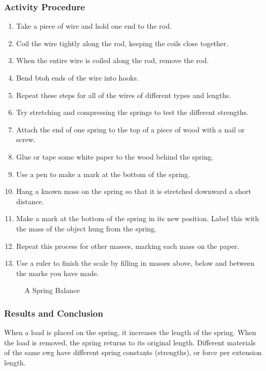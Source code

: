 \subsubsection*{Activity Procedure}
\begin{enumerate}
\item{Take a piece of wire and hold one end to the rod.}
\item{Coil the wire tightly along the rod, keeping the coils close together.}
\item{When the entire wire is coiled along the rod, remove the rod.}
\item{Bend btoh ends of the wire into hooks.}
\item{Repeat these steps for all of the wires of different types and lengths.}
\item{Try stretching and compressing the springs to test the different strengths.}
\item{Attach the end of one spring to the top of a piece of wood with a nail or screw.}
\item{Glue or tape some white paper to the wood behind the spring.}
\item{Use a pen to make a mark at the bottom of the spring.}
\item{Hang a known mass on the spring so that it is stretched downward a short distance.}
\item{Make a mark at the bottom of the spring in its new position.  Label this with the mass of the object hung from the spring.}
\item{Repeat this process for other masses, marking each mass on the paper.}
\item{Use a ruler to finish the scale by filling in masses above, below and between the marks you have made.}
\end{enumerate}

\begin{figure}
\begin{center}
\def\svgwidth{150pt}

\caption{A Spring Balance}
\label{fig:spring-balance}
\end{center}
\end{figure}

\subsubsection*{Results and Conclusion}
When a load is placed on the spring, it increases the length of the spring.  When the load is removed, the spring returns to its original length.
Different materials of the same swg have different spring constants (strengths), or force per extension length.

